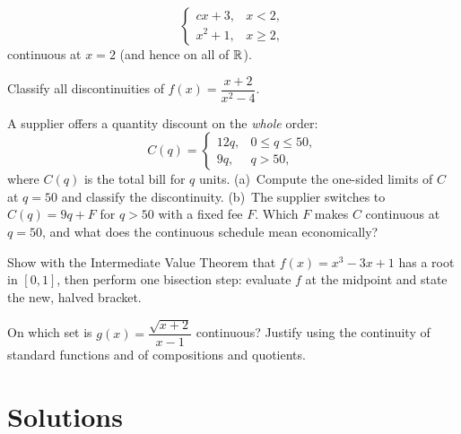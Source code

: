 \begin{problems}
\[\begin{cases}
            cx+3,    & x<2,\\
            x^{2}+1, & x\ge 2,
          \end{cases}
        \]
        continuous at $x=2$ (and hence on all of $\mathbb{R}$).
  \item Classify all discontinuities of
        $f(x)=\dfrac{x+2}{x^{2}-4}$.
  \item A supplier offers a quantity discount on the \emph{whole} order:
        \[
          C(q)=
          \begin{cases}
            12q, & 0\le q\le 50,\\
            9q,  & q>50,
          \end{cases}
        \]
        where $C(q)$ is the total bill for $q$ units.
        (a)~Compute the one-sided limits of $C$ at $q=50$ and classify
        the discontinuity.
        (b)~The supplier switches to $C(q)=9q+F$ for $q>50$ with a fixed
        fee $F$. Which $F$ makes $C$ continuous at $q=50$, and what does
        the continuous schedule mean economically?
  \item Show with the Intermediate Value Theorem that
        $f(x)=x^{3}-3x+1$ has a root in $[0,1]$, then perform one
        bisection step: evaluate $f$ at the midpoint and state the new,
        halved bracket.
  \item On which set is
        $g(x)=\dfrac{\sqrt{x+2}}{x-1}$
        continuous? Justify using the continuity of standard functions
        and of compositions and quotients.
\end{problems}

\section{Solutions}

